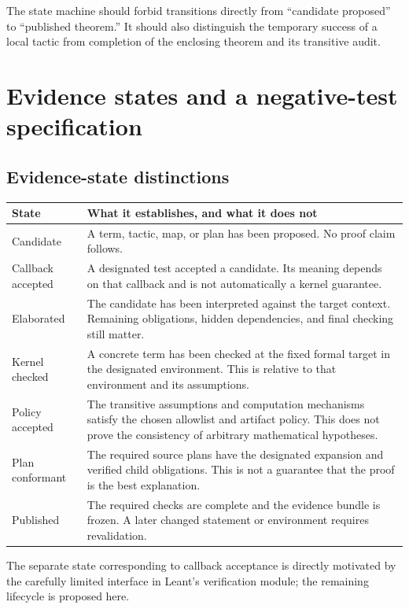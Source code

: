 \documentclass[11pt,a4paper]{article}
\theoremstyle{definition}
\theoremstyle{remark}
\numberwithin{equation}{section}
\begin{document}
The state machine should forbid transitions directly from ``candidate proposed'' to ``published theorem.'' It should also distinguish the temporary success of a local tactic from completion of the enclosing theorem and its transitive audit.

\clearpage
\section{Evidence states and a negative-test specification}
\label{app:tests}
\subsection*{Evidence-state distinctions}
\begin{longtable}{@{}P{.25\linewidth}P{.69\linewidth}@{}}
\toprule
State & What it establishes, and what it does not \\
\midrule
\endhead
Candidate & A term, tactic, map, or plan has been proposed. No proof claim follows. \\
\addlinespace
Callback accepted & A designated test accepted a candidate. Its meaning depends on that callback and is not automatically a kernel guarantee. \\
\addlinespace
Elaborated & The candidate has been interpreted against the target context. Remaining obligations, hidden dependencies, and final checking still matter. \\
\addlinespace
Kernel checked & A concrete term has been checked at the fixed formal target in the designated environment. This is relative to that environment and its assumptions. \\
\addlinespace
Policy accepted & The transitive assumptions and computation mechanisms satisfy the chosen allowlist and artifact policy. This does not prove the consistency of arbitrary mathematical hypotheses. \\
\addlinespace
Plan conformant & The required source plans have the designated expansion and verified child obligations. This is not a guarantee that the proof is the best explanation. \\
\addlinespace
Published & The required checks are complete and the evidence bundle is frozen. A later changed statement or environment requires revalidation. \\
\bottomrule
\end{longtable}
The separate state corresponding to callback acceptance is directly motivated by the carefully limited interface in Leant's verification module; the remaining lifecycle is proposed here.\cite{l-verification}
\end{document}
